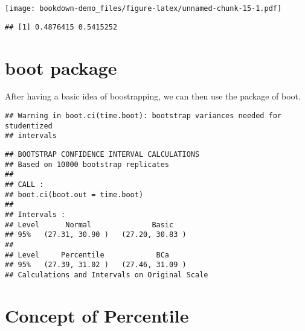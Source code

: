 \documentclass[]{book}
\newenvironment{Shaded}{\begin{snugshade}}{\end{snugshade}}
\newcommand{\ControlFlowTok}[1]{\textcolor[rgb]{0.13,0.29,0.53}{\textbf{#1}}}
\newcommand{\DecValTok}[1]{\textcolor[rgb]{0.00,0.00,0.81}{#1}}
\newcommand{\KeywordTok}[1]{\textcolor[rgb]{0.13,0.29,0.53}{\textbf{#1}}}
\newcommand{\NormalTok}[1]{#1}
\newcommand{\OperatorTok}[1]{\textcolor[rgb]{0.81,0.36,0.00}{\textbf{#1}}}
\newcommand{\StringTok}[1]{\textcolor[rgb]{0.31,0.60,0.02}{#1}}
\begin{document}
\texttt{[image: bookdown-demo\_files/figure-latex/unnamed-chunk-15-1.pdf]}

\begin{verbatim}
## [1] 0.4876415 0.5415252
\end{verbatim}

\hypertarget{boot-package}{%
\section{boot package}\label{boot-package}}

After having a basic idea of boostrapping, we can then use the package of boot.

\begin{Shaded}
\end{Shaded}

\begin{verbatim}
## Warning in boot.ci(time.boot): bootstrap variances needed for studentized
## intervals
\end{verbatim}

\begin{verbatim}
## BOOTSTRAP CONFIDENCE INTERVAL CALCULATIONS
## Based on 10000 bootstrap replicates
## 
## CALL : 
## boot.ci(boot.out = time.boot)
## 
## Intervals : 
## Level      Normal              Basic         
## 95%   (27.31, 30.90 )   (27.20, 30.83 )  
## 
## Level     Percentile            BCa          
## 95%   (27.39, 31.02 )   (27.46, 31.09 )  
## Calculations and Intervals on Original Scale
\end{verbatim}

\hypertarget{concept-of-percentile}{%
\section{Concept of Percentile}\label{concept-of-percentile}}
\end{document}
